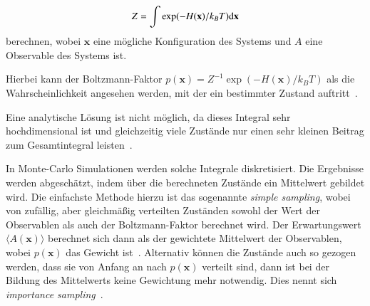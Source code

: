 	\[
	Z=\int \exp(-H(\mathbf{x})/k_BT) \text{d} \mathbf{x}
	\]
	berechnen, wobei $\mathbf{x}$ eine mögliche Konfiguration des Systems und $A$ eine Observable des Systems ist.
	
	
	Hierbei kann der Boltzmann-Faktor $p(\mathbf{x})=Z^{-1} \exp(-H(\mathbf{x})/k_BT)$ als die Wahrscheinlichkeit angesehen werden, mit der ein bestimmter Zustand auftritt~\cite[vgl. ][S. 8 f.]{binderheermann}.
	
	Eine analytische Lösung ist nicht möglich, da dieses Integral sehr hochdimensional ist und gleichzeitig viele Zustände nur einen sehr kleinen Beitrag zum Gesamtintegral leisten~\cite[vgl. ][S. 9]{binderheermann}.
	
	In Monte-Carlo Simulationen werden solche Integrale diskretisiert. Die Ergebnisse werden abgeschätzt, indem über die berechneten Zustände ein Mittelwert gebildet wird.
	Die einfachste Methode hierzu ist das sogenannte \textit{simple sampling}, wobei von zufällig, aber gleichmäßig verteilten Zuständen sowohl der Wert der Observablen als auch der Boltzmann-Faktor berechnet wird. Der Erwartungswert $\langle A(\mathbf{x}) \rangle$ berechnet sich dann als der gewichtete Mittelwert der Observablen, wobei $p(\mathbf{x})$ das Gewicht ist~\cite[vgl. ][S. 9 f.]{binderheermann}.
	 Alternativ können die Zustände auch so gezogen werden, dass sie von Anfang an nach $p(\mathbf{x})$ verteilt sind, dann ist bei der Bildung des Mittelwerts keine Gewichtung mehr notwendig. Dies nennt sich \textit{importance sampling}~\cite[vgl. ][S. 19 f.]{binderheermann}.
	
